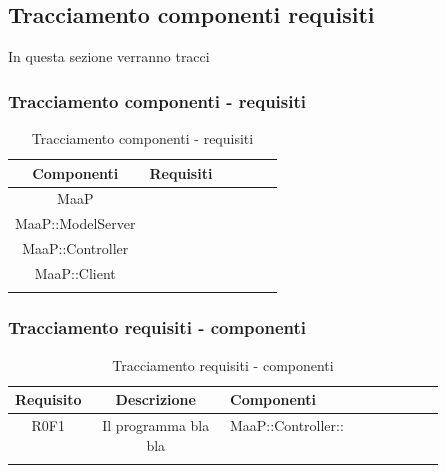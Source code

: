 \subsection{Tracciamento componenti requisiti}
In questa sezione verranno tracci


\subsubsection{Tracciamento componenti - requisiti} 
\begin{center}
\begin{longtable}{|c|p{0.5\linewidth}|}
\toprule
\textbf{Componenti} & \textbf{Requisiti}\\

\midrule MaaP & \\
\midrule MaaP::ModelServer & \\

\midrule MaaP::Controller & \\

\midrule MaaP::Client & \\


\bottomrule
\caption{Tracciamento componenti - requisiti}
\end{longtable}
\end{center}

\subsubsection{Tracciamento requisiti - componenti}
\begin{center}
\begin{longtable}{|c|c|p{0.5\linewidth}|}
\toprule
\textbf{Requisito} & \textbf{Descrizione} & \textbf{Componenti}\\

\midrule
R0F1 & Il programma bla bla & MaaP::Controller::\\

\bottomrule
\caption{Tracciamento requisiti - componenti}
\end{longtable}
\end{center} 
